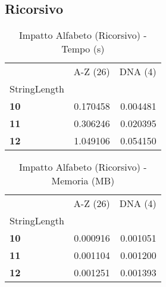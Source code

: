 \documentclass[a4paper, 11pt]{article}
\begin{document}
\subsection{Ricorsivo}
\begin{center}
\begin{table}[H]
\caption{Impatto Alfabeto (Ricorsivo) - Tempo (s)}
\label{tab:impatto_alfabeto_tempo_ricorsivo}
\begin{tabular}{l|r|r}
\toprule
 & A-Z (26) & DNA (4) \\
StringLength &  &  \\
\midrule
\textbf{10} & 0.170458 & 0.004481 \\
\textbf{11} & 0.306246 & 0.020395 \\
\textbf{12} & 1.049106 & 0.054150 \\
\bottomrule
\end{tabular}
\end{table}
\end{center}

\begin{center}
\begin{table}[H]
\caption{Impatto Alfabeto (Ricorsivo) - Memoria (MB)}
\label{tab:impatto_alfabeto_memoria_ricorsivo}
\begin{tabular}{l|r|r}
\toprule
 & A-Z (26) & DNA (4) \\
StringLength &  &  \\
\midrule
\textbf{10} & 0.000916 & 0.001051 \\
\textbf{11} & 0.001104 & 0.001200 \\
\textbf{12} & 0.001251 & 0.001393 \\
\bottomrule
\end{tabular}
\end{table}
\end{center}
\end{document}
